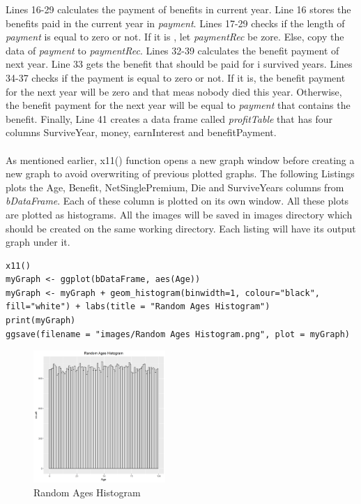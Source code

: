 \documentclass[12pt]{article}
\begin{document}
Lines 16-29 calculates the payment of benefits in current year. Line 16 stores the benefits paid in the current year in \textit{payment}. Lines 17-29 checks if the length of \textit{payment} is equal to zero or not. If it is , let \textit{paymentRec} be zore. Else, copy the data of \textit{payment} to \textit{paymentRec}. Lines 32-39 calculates the benefit payment of next year.
Line 33 gets the benefit that should be paid for i survived years. Lines 34-37 checks if the payment is equal to zero or not. If it is, the benefit payment for the next year will be zero and that meas nobody died this year. Otherwise, the benefit payment for the next year will be equal to \textit{payment} that contains the benefit. Finally, Line 41 creates a data frame called \textit{profitTable} that has four columns SurviveYear, money, earnInterest and benefitPayment.
\\
\\
As mentioned earlier, x11() function opens a new graph window before creating a new graph to avoid overwriting of previous plotted graphs.  The following Listings  plots the Age, Benefit, NetSinglePremium, Die and SurviveYears columns from \textit{bDataFrame}. Each of these column is plotted on its own window. All these plots are plotted as histograms. All the images will be saved in images directory which should be created on the same working directory. Each listing  will have its output graph under it.

\begin{lstlisting}[caption={ Random Ages Histogram},captionpos=b]
x11()
myGraph <- ggplot(bDataFrame, aes(Age))
myGraph <- myGraph + geom_histogram(binwidth=1, colour="black", fill="white") + labs(title = "Random Ages Histogram")
print(myGraph)
ggsave(filename = "images/Random Ages Histogram.png", plot = myGraph)
\end{lstlisting}
\pagebreak
\begin{figure}[h]
	\centering
	\includegraphics[width=0.5\linewidth, height=5cm]{S2.png}
	\caption{Random Ages Histogram }
	
\end{figure}
\end{document}
